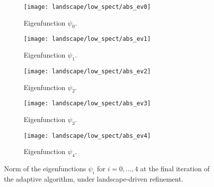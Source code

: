 \begin{figure}[htbp]
    \begin{subfigure}[t]{0.49\textwidth}
        \centering
        \texttt{[image: landscape/low\_spect/abs\_ev0]}
        \caption{Eigenfunction \(\psi_0\).}
        \label{fig:eigenfunction_0}
    \end{subfigure}
    \begin{subfigure}[t]{0.49\textwidth}
        \centering
        \texttt{[image: landscape/low\_spect/abs\_ev1]}
        \caption{Eigenfunction \(\psi_1\).}
        \label{fig:eigenfunction_1}
    \end{subfigure}
    \vspace{1cm}
    \begin{subfigure}[t]{0.49\textwidth}
        \centering
        \texttt{[image: landscape/low\_spect/abs\_ev2]}
        \caption{Eigenfunction \(\psi_2\).}
        \label{fig:eigenfunction_2}
    \end{subfigure}
    \begin{subfigure}[t]{0.49\textwidth}
        \centering
        \texttt{[image: landscape/low\_spect/abs\_ev3]}
        \caption{Eigenfunction \(\psi_3\).}
        \label{fig:eigenfunction_3}
    \end{subfigure}
    \vspace{1cm}
    \begin{subfigure}[t]{0.49\textwidth}
        \centering
        \texttt{[image: landscape/low\_spect/abs\_ev4]}
        \caption{Eigenfunction \(\psi_4\).}
        \label{fig:eigenfunction_4}
    \end{subfigure}
    \caption{Norm of the eigenfunctions \(\psi_i\) for \(i = 0, \ldots, 4\) at the final iteration of the adaptive algorithm, under landscape-driven refinement.}
\end{figure}


